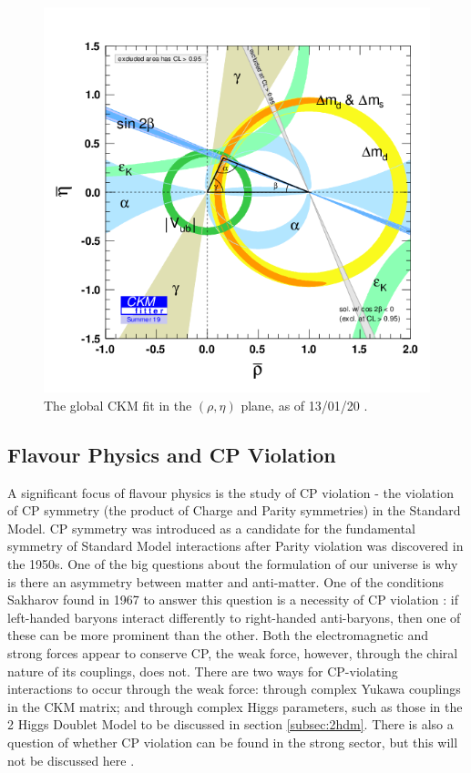 \documentclass[a4paper,12pt]{article}
\begin{document}
\begin{figure}[H]
    \centering
    \includegraphics[scale=0.5]{rhoeta_large.png}
    \caption{\label{fig:ckmfitter} The global CKM fit in the $(\rho,\eta)$ plane, as of 13/01/20 \cite{g}.}
\end{figure}

\subsection{Flavour Physics and CP Violation}
\label{subsec:flavobs}
A significant focus of flavour physics is the study of CP violation - the violation of CP symmetry (the product of Charge and Parity symmetries) in the Standard Model.
CP symmetry was introduced as a candidate for the fundamental symmetry of Standard Model interactions after Parity violation was discovered in the 1950s.
One of the big questions about the formulation of our universe is why is there an asymmetry between matter and anti-matter. 
One of the conditions Sakharov found in 1967 to answer this question is a necessity of CP violation \cite{h}: if left-handed baryons interact differently to right-handed anti-baryons, then one of these can be more prominent than the other. 
Both the electromagnetic and strong forces appear to conserve CP, the weak force, however, through the chiral nature of its couplings, does not.
There are two ways for CP-violating interactions to occur through the weak force: through complex Yukawa couplings in the CKM matrix; and through complex Higgs parameters, such as those in the 2 Higgs Doublet Model to be discussed in section \ref{subsec:2hdm}.
There is also a question of whether CP violation can be found in the strong sector, but this will not be discussed here \cite{m}.
\end{document}
